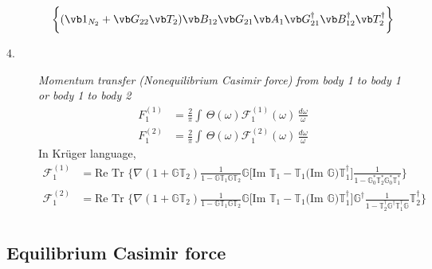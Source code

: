 \documentclass[letterpaper]{article}
\newcommand{\TT}{\mathbb{T}}
\newcommand{\GG}{\mathbb{G}}
\newcommand{\im}{\text{Im }}
\begin{document}
\begin{description}
\begin{align}
   \bigg\{ (\vb 1_{N_2} + \vb G_{22} \vb T_2) \vb B_{12}
           \vb G_{21} \vb A_{1} \vb G_{21}^\dagger
           \vb B_{12}^\dagger \vb T_2^\dagger
   \bigg\}
\end{align}
 \item[4.] \textit{ Momentum transfer (Nonequilibrium Casimir force) 
                    from body 1 to body 1 or body 1 to body 2} 
 \begin{align*}
   F_1^{(1)}&=\frac{2}{\pi}
   \int \,\Theta(\omega) \mathcal{F}_1^{(1)}(\omega)\,\frac{d\omega}{\omega}
\\
   F_1^{(2)}&=\frac{2}{\pi}
   \int \,\Theta(\omega) \mathcal{F}_1^{(2)}(\omega)\,\frac{d\omega}{\omega}
 \end{align*}
In Kr\"uger language,
\begin{align*}
 \mathcal{F}_1^{(1)}&=\text{Re Tr }
   \bigg\{ \nabla (1 + \GG \TT_2) 
           \frac{1}{1-\GG \TT_1 \GG \TT_2}
           \GG 
           \Big[ \im \TT_1 - \TT_1 \big(\im \GG\big) \TT_1^\dagger \Big] 
           \frac{1}{1-\GG_0^* \TT_2^* \GG_0^* \TT_1^*}
   \bigg\}
\\
 \mathcal{F}_1^{(2)}&=\text{Re Tr }
   \bigg\{ \nabla (1 + \GG \TT_2) 
           \frac{1}{1-\GG \TT_1 \GG \TT_2}
           \GG 
           \Big[ \im \TT_1 - \TT_1 \big(\im \GG\big) \TT_1^\dagger \Big] 
           \GG^\dagger
           \frac{1}{1-\TT_2^\dagger \GG^\dagger \TT_1^\dagger \GG}
           \TT_2^\dagger
   \bigg\}
\\
\end{align*}
\end{description}

\subsection*{Equilibrium Casimir force}
\end{document}
